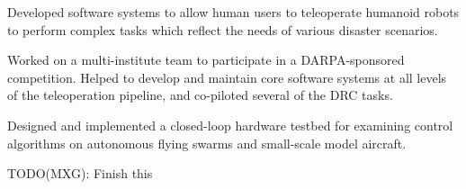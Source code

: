 \documentclass[10pt,a4paper,ragged2e]{altacv}
\begin{document}
\divider

Developed software systems to allow human users to teleoperate humanoid robots to perform complex tasks which reflect the needs of various disaster scenarios.

\divider

Worked on a multi-institute team to participate in a DARPA-sponsored competition. Helped to develop and maintain core software systems at all levels of the teleoperation pipeline, and co-piloted several of the DRC tasks.

\divider

Designed and implemented a closed-loop hardware testbed for examining control algorithms on autonomous flying swarms and small-scale model aircraft.

\clearpage
{}

TODO(MXG): Finish this

\nocite{*}

\printbibliography[heading=pubtype,title={\printinfo{\faBook}{Books}},type=book]

\divider

\printbibliography[heading=pubtype,title={\printinfo{\faFileTextO}{Journal Articles}},type=article]

\divider

\printbibliography[heading=pubtype,title={\printinfo{\faGroup}{Conference Proceedings}},type=inproceedings]

\end{document}
